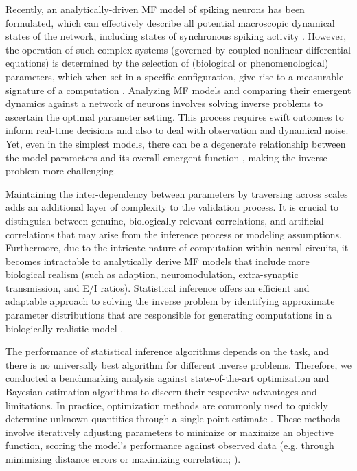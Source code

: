 \documentclass[preprint,11pt,authoryear]{elsarticle}
\begin{document}
Recently, an analytically-driven MF model of spiking neurons has been formulated, which can effectively describe all potential macroscopic dynamical states of the network, including states of synchronous spiking activity \citep{Montbrio_Pazo_Roxin}. However, the operation of such complex systems (governed by coupled nonlinear differential equations) is determined by the selection of (biological or phenomenological) parameters, which when set in a specific configuration, give rise to a measurable signature of a computation \citep{Achard2006, Sussillo2014}. Analyzing MF models and comparing their emergent dynamics against a network of neurons involves solving inverse problems to ascertain the optimal parameter setting. This process requires swift outcomes to inform real-time decisions and also to deal with observation and dynamical noise. Yet, even in the simplest models, there can be a degenerate relationship between the model parameters and its overall emergent function \citep{Edelman2001, Prinz2004, Alonso2019}, making the inverse problem more challenging. 

Maintaining the inter-dependency between parameters by traversing across scales adds an additional layer of complexity to the validation process. It is crucial to distinguish between genuine, biologically relevant correlations, and artificial correlations that may arise from the inference process or modeling assumptions. Furthermore, due to the intricate nature of computation within neural circuits, it becomes intractable to analytically derive MF models that include more biological realism (such as adaption, neuromodulation, extra-synaptic transmission, and  E/I ratios). Statistical inference offers an efficient and adaptable approach to solving the inverse problem by identifying approximate parameter distributions that are responsible for generating computations in a biologically realistic model \citep{Achard2006, Liepe2014, Lueckmann2017, Goncalves2020, Bittner2021, Mlynarski2021}. 


The performance of statistical inference algorithms depends on the task, and there is no universally best algorithm for different inverse problems. Therefore, we conducted a benchmarking analysis against state-of-the-art optimization and Bayesian estimation algorithms to discern their respective advantages and limitations.
In practice, optimization methods are commonly used to quickly determine unknown quantities through a single point estimate \citep{Mendes1998, Nocedal1999, Kelley1999, Floudas2009}. These methods involve iteratively adjusting parameters to minimize or maximize an objective function, scoring the model's performance against observed data (e.g. through minimizing distance errors or maximizing correlation; \cite{Banga2008, Tashkova2011, Svensson2012, Hashemi2018}). 
\end{document}
